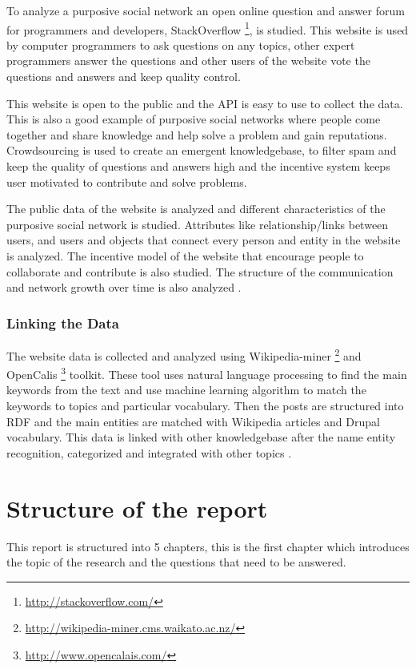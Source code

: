 To analyze a purposive social network an open online question and answer forum for programmers and developers, StackOverflow \footnote{\url{http://stackoverflow.com/}}, is studied. This website is used by computer programmers to ask questions on any topics, other expert programmers answer the questions and other users of the website vote the questions and answers and keep quality control.

This website is open to the public and the API is easy to use to collect the data. This is also a good example of purposive social networks where people come together and share knowledge and help solve a problem and gain reputations. Crowdsourcing is used to create an emergent knowledgebase, to filter spam and keep the quality of questions and answers high and the incentive system keeps user motivated to contribute and solve problems.

The public data of the website is analyzed and different characteristics of the purposive social network is studied. Attributes like relationship/links between users, and users and objects that connect every person and entity in the website is analyzed. The incentive model of the website that encourage people to collaborate and contribute is also studied. The structure of the communication and network growth over time is also analyzed \cite{mika2005flink}.


\subsubsection{Linking the Data}

The website data is collected and analyzed using Wikipedia-miner \footnote{\url{http://wikipedia-miner.cms.waikato.ac.nz/}} \cite{milne2012open} and OpenCalis \footnote{\url{http://www.opencalais.com/}} toolkit. These tool uses natural language processing to find the main keywords from the text and use machine learning algorithm to match the keywords to topics and particular vocabulary.  Then the posts are structured into RDF and the main entities are matched with Wikipedia articles and Drupal vocabulary. This data is linked with other knowledgebase after the name entity recognition, categorized and integrated with other topics \cite{Glaser2009}.

\section{Structure of the report}

This report is structured into 5 chapters, this is the first chapter which introduces the topic of the research and the questions that need to be answered.

